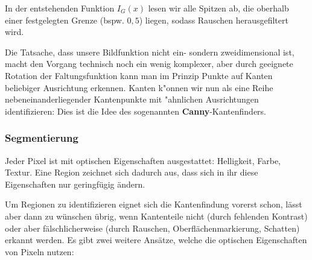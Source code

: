 
In der entstehenden Funktion $I_G(x)$ lesen wir alle Spitzen ab, die oberhalb einer festgelegten Grenze (bspw. $0,5$) liegen, sodass Rauschen herausgefiltert wird.


Die Tatsache, dass unsere Bildfunktion nicht ein- sondern zweidimensional ist,
macht den Vorgang technisch noch ein wenig komplexer, aber durch geeignete Rotation
der Faltungsfunktion kann man im Prinzip Punkte auf Kanten beliebiger Ausrichtung erkennen.
Kanten k"onnen wir nun als eine Reihe nebeneinanderliegender Kantenpunkte mit "ahnlichen Ausrichtungen identifizieren: Dies ist die Idee des sogenannten \textbf{Canny}-Kantenfinders.

\subsubsection{Segmentierung}

Jeder Pixel ist mit optischen Eigenschaften ausgestattet: Helligkeit, Farbe, Textur. Eine Region zeichnet sich dadurch aus, dass sich in ihr diese Eigenschaften nur geringfügig ändern.

Um Regionen zu identifizieren eignet sich die Kantenfindung vorerst schon, lässt aber dann zu wünschen übrig, wenn Kantenteile nicht (durch fehlenden Kontrast) oder aber fälschlicherweise (durch Rauschen, Oberflächenmarkierung, Schatten) erkannt werden. Es gibt zwei weitere Ansätze, welche die optischen Eigenschaften von Pixeln nutzen:

